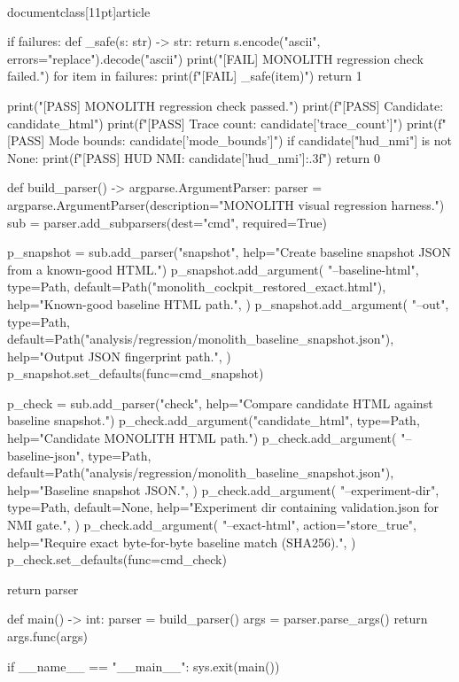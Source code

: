 \\documentclass[11pt]{article}
\begin{document}
\begin{CodeBlock}
    if failures:
        def _safe(s: str) -> str:
            return s.encode("ascii", errors="replace").decode("ascii")
        print("[FAIL] MONOLITH regression check failed.")
        for item in failures:
            print(f"[FAIL] {_safe(item)}")
        return 1

    print("[PASS] MONOLITH regression check passed.")
    print(f"[PASS] Candidate: {candidate_html}")
    print(f"[PASS] Trace count: {candidate['trace_count']}")
    print(f"[PASS] Mode bounds: {candidate['mode_bounds']}")
    if candidate["hud_nmi"] is not None:
        print(f"[PASS] HUD NMI: {candidate['hud_nmi']:.3f}")
    return 0


def build_parser() -> argparse.ArgumentParser:
    parser = argparse.ArgumentParser(description="MONOLITH visual regression harness.")
    sub = parser.add_subparsers(dest="cmd", required=True)

    p_snapshot = sub.add_parser("snapshot", help="Create baseline snapshot JSON from a known-good HTML.")
    p_snapshot.add_argument(
        "--baseline-html",
        type=Path,
        default=Path("monolith_cockpit_restored_exact.html"),
        help="Known-good baseline HTML path.",
    )
    p_snapshot.add_argument(
        "--out",
        type=Path,
        default=Path("analysis/regression/monolith_baseline_snapshot.json"),
        help="Output JSON fingerprint path.",
    )
    p_snapshot.set_defaults(func=cmd_snapshot)

    p_check = sub.add_parser("check", help="Compare candidate HTML against baseline snapshot.")
    p_check.add_argument("candidate_html", type=Path, help="Candidate MONOLITH HTML path.")
    p_check.add_argument(
        "--baseline-json",
        type=Path,
        default=Path("analysis/regression/monolith_baseline_snapshot.json"),
        help="Baseline snapshot JSON.",
    )
    p_check.add_argument(
        "--experiment-dir",
        type=Path,
        default=None,
        help="Experiment dir containing validation.json for NMI gate.",
    )
    p_check.add_argument(
        "--exact-html",
        action="store_true",
        help="Require exact byte-for-byte baseline match (SHA256).",
    )
    p_check.set_defaults(func=cmd_check)

    return parser


def main() -> int:
    parser = build_parser()
    args = parser.parse_args()
    return args.func(args)


if __name__ == "__main__":
    sys.exit(main())

\end{CodeBlock}
\end{document}
